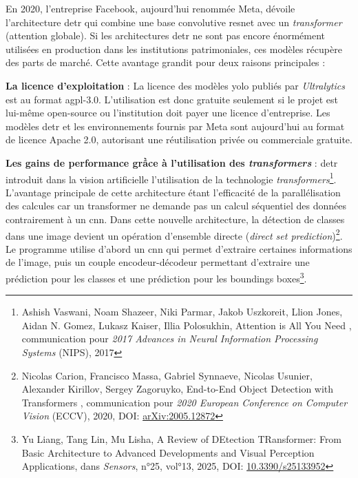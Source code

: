 En 2020, l'entreprise Facebook, aujourd'hui renommée Meta, dévoile l'architecture \gls{detr} qui combine une base convolutive \gls{resnet} avec un \textit{transformer} (attention globale). Si les architectures \gls{detr} ne sont pas encore énormément utilisées en production dans les institutions patrimoniales, ces modèles récupère des parts de marché. Cette avantage grandit pour deux raisons principales : 
\begin{description}
    \item \textbf{La licence d'exploitation} : La licence des modèles \gls{yolo} publiés par \textit{Ultralytics} est au format \gls{agpl}-3.0. L'utilisation est donc gratuite seulement si le projet est lui-même open-source ou l'institution doit payer une licence d'entreprise. Les modèles \gls{detr} et les environnements fournis par Meta sont aujourd'hui au format de licence Apache 2.0, autorisant une réutilisation privée ou commerciale gratuite.

    \item \textbf{Les gains de performance grầce à l'utilisation des \textit{transformers}} : \gls{detr} introduit dans la vision artificielle l'utilisation de la technologie \textit{transformers}\footnote{Ashish Vaswani, Noam Shazeer, Niki Parmar, Jakob Uszkoreit, Llion Jones, Aidan N. Gomez, Lukasz Kaiser, Illia Polosukhin, \og Attention is All You Need \fg, communication pour \textit{2017 Advances in Neural Information Processing Systems} (NIPS), 2017}. L'avantage principale de cette architecture étant l'efficacité de la parallélisation des calcules car un transformer ne demande pas un calcul séquentiel des données contrairement à un \gls{cnn}.  Dans cette nouvelle architecture, la détection de classes dans une image devient un opération d'ensemble directe (\textit{direct set prediction})\footnote{Nicolas Carion, Francisco Massa, Gabriel Synnaeve, Nicolas Usunier,
    Alexander Kirillov, Sergey Zagoruyko, \og End-to-End Object Detection with Transformers \fg, communication pour \textit{2020 European Conference on Computer Vision} (ECCV), 2020, DOI: \href{arXiv:2005.12872}{arXiv:2005.12872}}. Le programme utilise d'abord un \gls{cnn} qui permet d'extraire certaines informations de l'image, puis un couple encodeur-décodeur permettant d'extraire une prédiction pour les classes et une prédiction pour les boundings boxes\footnote{Yu Liang, Tang Lin, Mu Lisha, \og A Review of DEtection TRansformer: From Basic Architecture to Advanced Developments and Visual Perception Applications\fg, dans \textit{Sensors}, n°25, vol°13, 2025, DOI: \href{10.3390/s25133952}{10.3390/s25133952}}.
\end{description}

